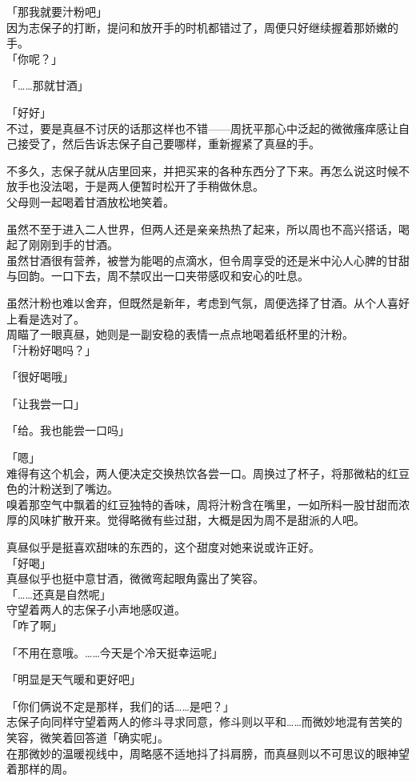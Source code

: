 「那我就要汁粉吧」\\

因为志保子的打断，提问和放开手的时机都错过了，周便只好继续握着那娇嫩的手。\\

「你呢？」

「……那就甘酒」

「好好」\\

不过，要是真昼不讨厌的话那这样也不错——周抚平那心中泛起的微微瘙痒感让自己接受了，然后告诉志保子自己要哪样，重新握紧了真昼的手。\\

\vspace{2\baselineskip}

不多久，志保子就从店里回来，并把买来的各种东西分了下来。再怎么说这时候不放手也没法喝，于是两人便暂时松开了手稍做休息。\\

父母则一起喝着甘酒放松地笑着。

虽然不至于进入二人世界，但两人还是亲亲热热了起来，所以周也不高兴搭话，喝起了刚刚到手的甘酒。\\

虽然甘酒很有营养，被誉为能喝的点滴水，但令周享受的还是米中沁人心脾的甘甜与回韵。一口下去，周不禁叹出一口夹带感叹和安心的吐息。

虽然汁粉也难以舍弃，但既然是新年，考虑到气氛，周便选择了甘酒。从个人喜好上看是选对了。\\

周瞄了一眼真昼，她则是一副安稳的表情一点点地喝着纸杯里的汁粉。\\

「汁粉好喝吗？」

「很好喝哦」

「让我尝一口」

「给。我也能尝一口吗」

「嗯」\\

难得有这个机会，两人便决定交换热饮各尝一口。周换过了杯子，将那微粘的红豆色的汁粉送到了嘴边。\\

嗅着那空气中飘着的红豆独特的香味，周将汁粉含在嘴里，一如所料一股甘甜而浓厚的风味扩散开来。觉得略微有些过甜，大概是因为周不是甜派的人吧。

真昼似乎是挺喜欢甜味的东西的，这个甜度对她来说或许正好。\\

「好喝」\\

真昼似乎也挺中意甘酒，微微弯起眼角露出了笑容。\\

「……还真是自然呢」\\

守望着两人的志保子小声地感叹道。\\

「咋了啊」

「不用在意哦。……今天是个冷天挺幸运呢」

「明显是天气暖和更好吧」

「你们俩说不定是那样，我们的话……是吧？」\\

志保子向同样守望着两人的修斗寻求同意，修斗则以平和……而微妙地混有苦笑的笑容，微笑着回答道「确实呢」。\\

在那微妙的温暖视线中，周略感不适地抖了抖肩膀，而真昼则以不可思议的眼神望着那样的周。
